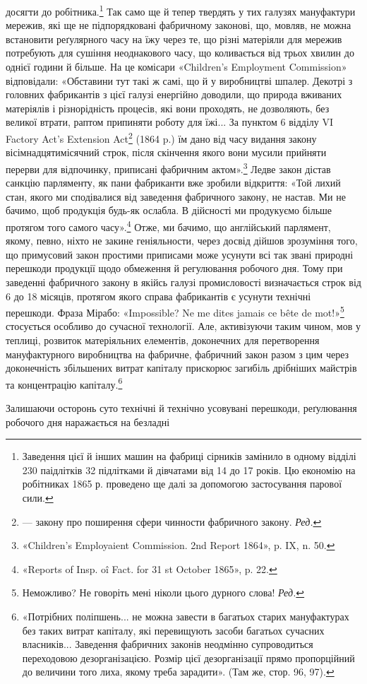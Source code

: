 досягти до робітника.\footnote{
Заведення цієї й інших машин на фабриці сірників замінило в
одному відділі  230 паідлітків 32 підлітками й дівчатами від 14 до 17 років.
Цю економію на робітниках 1865 р. проведено ще далі за допомогою застосування
парової сили.
} Так само ще й тепер твердять у тих
галузях мануфактури мережив, які ще не підпорядковані фабричному
законові, що, мовляв, не можна встановити реґулярного
часу на їжу через те, що різні матеріяли для мережив потребують
для сушіння неоднакового часу, що коливається від трьох хвилин
до однієї години й більше. На це комісари «Children’s Employment
Commission» відповідали: «Обставини тут такі ж самі, що
й у виробництві шпалер. Декотрі з головних фабрикантів з цієї
галузі енергійно доводили, що природа вживаних матеріялів і
різнорідність процесів, які вони проходять, не дозволяють, без великої
втрати, раптом припиняти роботу для їжі... За пунктом 6
відділу VI Factory Act’s Extension Act\footnote*{
— закону про поширення сфери чинности фабричного закону. \emph{Ред.}
} (1864 p.) їм дано від
часу видання закону вісімнадцятимісячний строк, після скінчення
якого вони мусили прийняти перерви для відпочинку,
приписані фабричним актом».\footnote{
«Children’s Employaient Commission. 2nd Report 1864», p. IX,
n. 50.
} Ледве закон дістав санкцію
парляменту, як пани фабриканти вже зробили відкриття: «Той
лихий стан, якого ми сподівалися від заведення фабричного закону,
не настав. Ми не бачимо, щоб продукція будь-як ослабла.
В дійсності ми продукуємо більше протягом того самого часу».\footnote{
«Reports of Insp. oî Fact. for 31 st October 1865», p. 22.
}
Отже, ми бачимо, що англійський парлямент, якому, певно,
ніхто не закине геніяльности, через досвід дійшов зрозуміння
того, що примусовий закон простими приписами може усунути
всі так звані природні перешкоди продукції щодо обмеження
й регулювання робочого дня. Тому при заведенні фабричного
закону в якійсь галузі промисловості визначається строк від 6
до 18 місяців, протягом якого справа фабрикантів є усунути
технічні перешкоди. Фраза Мірабо: «Impossible? Ne me dites
jamais ce bête de mot!»\footnote*{
Неможливо? Не говоріть мені ніколи цього дурного слова! \emph{Ред.}
} стосується особливо до сучасної технології.
Але, активізуючи таким чином, мов у теплиці, розвиток
матеріяльних елементів, доконечних для перетворення мануфактурного
виробництва на фабричне, фабричний закон разом з
цим через доконечність збільшених витрат капіталу прискорює
загибіль дрібніших майстрів та концентрацію капіталу.\footnote{
«Потрібних поліпшень... не можна завести в багатьох старих
мануфактурах без таких витрат капіталу, які перевищують засоби багатьох
сучасних власників... Заведення фабричних законів неодмінно
супроводиться переходовою дезорганізацією. Розмір цієї дезорганізації
прямо пропорційний до величини того лиха, якому треба зарадити».
(Там же, стор. 96, 97).
}

Залишаючи осторонь суто технічні й технічно усовувані
перешкоди, реґулювання робочого дня наражається на безладні